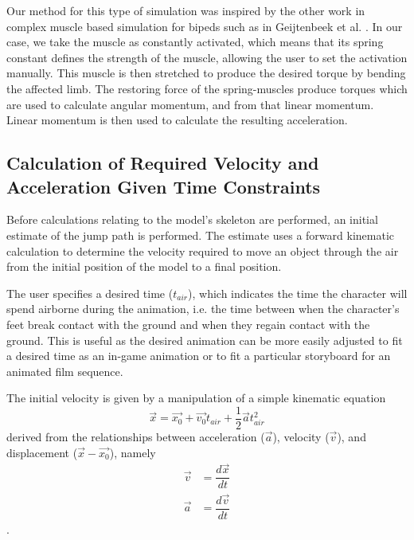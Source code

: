Our method for this type of simulation was inspired by the other work in complex muscle based simulation for bipeds such as in Geijtenbeek et al. \cite{muscle_based_bipeds}.  In our case, we take the muscle as constantly activated, which means that its spring constant defines the strength of the muscle, allowing the user to set the activation manually.  This muscle is then stretched to produce the desired torque by bending the affected limb.  The restoring force of the spring-muscles produce torques which are used to calculate angular momentum, and from that linear momentum.  Linear momentum is then used to calculate the resulting acceleration.

\subsection{Calculation of Required Velocity and Acceleration Given Time Constraints}
\label{subsection:torque_path}
%	

Before calculations relating to the model's skeleton are performed, an initial estimate of the jump path is performed.  The estimate uses a forward kinematic calculation to determine the velocity required to move an object through the air from the initial position of the model to a final position.

The user specifies a desired time ($t_{air}$), which indicates the time the character will spend airborne during the animation, i.e. the time between when the character's feet break contact with the ground and when they regain contact with the ground.  This is useful as the desired animation can be more easily adjusted to fit a desired time as an in-game animation or to fit a particular storyboard for an animated film sequence.

The initial velocity is given by a manipulation of a simple kinematic equation \[ \vec{x} = \vec{x_0} + \vec{v_0} t_{air} + \frac{1}{2} \vec{a} t_{air}^2 \] derived from the relationships between acceleration ($\vec{a}$), velocity ($\vec{v}$), and displacement ($\vec{x} - \vec{x_0}$), namely
\begin{align*}
	\vec{v} &= \dfrac{d\vec{x}}{dt} \\
	\vec{a} &= \dfrac{d\vec{v}}{dt}
\end{align*}.

